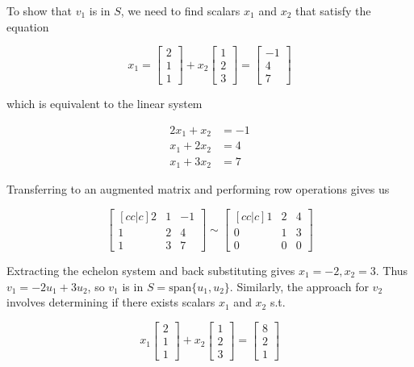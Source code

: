         To show that $v_1$ is in $S$, we need to find scalars $x_1$ and $x_2$ that satisfy the equation

        \[
            x_1 = \begin{bmatrix} 2 \\ 1 \\ 1 \end{bmatrix}
            + x_2 \begin{bmatrix} 1 \\ 2 \\ 3 \end{bmatrix}
            =     \begin{bmatrix}-1 \\ 4 \\ 7 \end{bmatrix}
        \]

        which is equivalent to the linear system

        \begin{align*}
            2x_1 + x_2  &= -1 \\
            x_1 + 2x_2  &= 4 \\
            x_1 + 3x_2  &= 7
        \end{align*}

        Transferring to an augmented matrix and performing row operations gives us

        \[
            \begin{bmatrix}[cc|c]
                2 & 1 & -1 \\
                1 & 2 & 4 \\
                1 & 3 & 7
            \end{bmatrix}
            \sim
            \begin{bmatrix}[cc|c]
                1 & 2 & 4 \\
                0 & 1 & 3 \\
                0 & 0 & 0
            \end{bmatrix}
        \]

        Extracting the echelon system and back substituting gives $x_1 = -2, x_2 = 3$. Thus $v_1 = -2u_1 + 3u_2$, so $v_1$ is in $S = \text{span}\{u_1, u_2\}$. Similarly, the approach for $v_2$ involves determining
        if there exists scalars $x_1$ and $x_2$ s.t.

        \[
            x_1 \begin{bmatrix} 2 \\ 1 \\ 1 \end{bmatrix} + x_2 \begin{bmatrix} 1 \\ 2 \\ 3 \end{bmatrix} = \begin{bmatrix} 8 \\ 2 \\ 1 \end{bmatrix}
        \]

